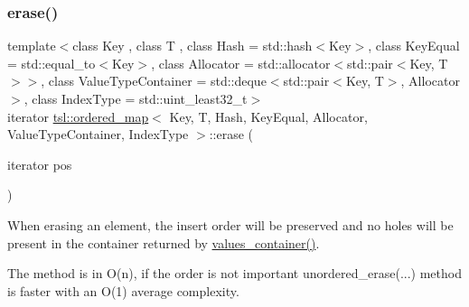\subsubsection{\texorpdfstring{erase()}{erase()}\hspace{0.1cm}{\footnotesize\ttfamily [1/7]}}
{\footnotesize\ttfamily template$<$class Key , class T , class Hash  = std\+::hash$<$\+Key$>$, class Key\+Equal  = std\+::equal\+\_\+to$<$\+Key$>$, class Allocator  = std\+::allocator$<$std\+::pair$<$\+Key, T$>$$>$, class Value\+Type\+Container  = std\+::deque$<$std\+::pair$<$\+Key, T$>$, Allocator$>$, class Index\+Type  = std\+::uint\+\_\+least32\+\_\+t$>$ \\
iterator \mbox{\hyperlink{classtsl_1_1ordered__map}{tsl\+::ordered\+\_\+map}}$<$ Key, T, Hash, Key\+Equal, Allocator, Value\+Type\+Container, Index\+Type $>$\+::erase (\begin{DoxyParamCaption}\item[{iterator}]{pos }\end{DoxyParamCaption})\hspace{0.3cm}{\ttfamily [inline]}}

When erasing an element, the insert order will be preserved and no holes will be present in the container returned by \textquotesingle{}\mbox{\hyperlink{classtsl_1_1ordered__map_abb69bca0a80def48ae806078d77175cb}{values\+\_\+container()}}\textquotesingle{}.

The method is in O(n), if the order is not important \textquotesingle{}unordered\+\_\+erase(...)\textquotesingle{} method is faster with an O(1) average complexity. \mbox{\label{classtsl_1_1ordered__map_ac680d06a37e264ed8ee8ff656ff2d373}} 
